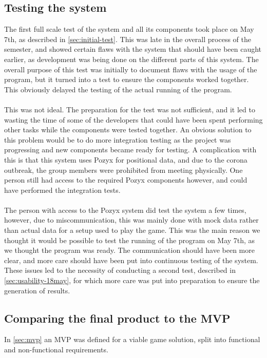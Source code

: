 \subsection{Testing the system}
The first full scale test of the system and all its components took place on May 7th, as described in \autoref{sec:initial-test}.
This was late in the overall process of the semester, and showed certain flaws with the system that should have been caught earlier, as development was being done on the different parts of this system.
The overall purpose of this test was initially to document flaws with the usage of the program, but it turned into a test to ensure the components worked together.
This obviously delayed the testing of the actual running of the program.
\\\\
This was not ideal.
The preparation for the test was not sufficient, and it led to wasting the time of some of the developers that could have been spent performing other tasks while the components were tested together.
An obvious solution to this problem would be to do more integration testing as the project was progressing and new components became ready for testing.
A complication with this is that this system uses Pozyx for positional data, and due to the corona outbreak, the group members were prohibited from meeting physically.
One person still had access to the required Pozyx components however, and could have performed the integration tests.
\\\\
The person with access to the Pozyx system did test the system a few times, however, due to miscommunication, this was mainly done with mock data rather than actual data for a setup used to play the game.
This was the main reason we thought it would be possible to test the running of the program on May 7th, as we thought the program was ready.
The communication should have been more clear, and more care should have been put into continuous testing of the system.
These issues led to the necessity of conducting a second test, described in \autoref{sec:usability-18may}, for which more care was put into preparation to ensure the generation of results.

\subsection{Comparing the final product to the MVP}
In \autoref{sec:mvp} an MVP was defined for a viable game solution, split into functional and non-functional requirements.

